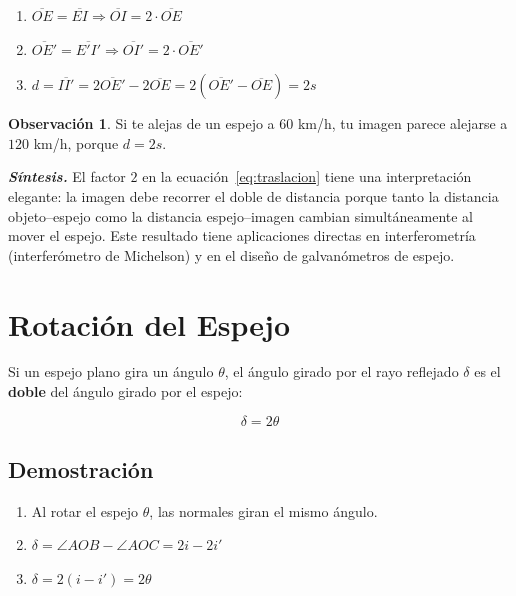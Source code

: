 \documentclass[12pt, a4paper]{article}
\theoremstyle{definition}
\newtheorem{observacion}{Observación}[section]
\begin{document}
\begin{enumerate}
  \item \(\overline{OE} = \overline{EI} \Rightarrow \overline{OI} = 2 \cdot \overline{OE}\)
  \item \(\overline{OE'} = \overline{E'I'} \Rightarrow \overline{OI'} = 2 \cdot \overline{OE'}\)
  \item \(d = \overline{II'} = 2\overline{OE'} - 2\overline{OE} = 2(\overline{OE'} - \overline{OE}) = 2s\)
\end{enumerate}

\begin{observacion}
Si te alejas de un espejo a \(60\) km/h, tu imagen parece alejarse a \(120\) km/h, porque \(d = 2s\).
\end{observacion}

\textit{\textbf{Síntesis.}} El factor \(2\) en la ecuación~\eqref{eq:traslacion} tiene una interpretación elegante: la imagen debe recorrer el doble de distancia porque tanto la distancia objeto–espejo como la distancia espejo–imagen cambian simultáneamente al mover el espejo. Este resultado tiene aplicaciones directas en interferometría (interferómetro de Michelson) y en el diseño de galvanómetros de espejo.

\section{Rotación del Espejo}

Si un espejo plano gira un ángulo \(\theta\), el ángulo girado por el rayo reflejado \(\delta\) es el \textbf{doble} del ángulo girado por el espejo:

\begin{equation}
  \delta = 2\theta
  \label{eq:rotacion}
\end{equation}

\subsection{Demostración}

\begin{enumerate}
  \item Al rotar el espejo \(\theta\), las normales giran el mismo ángulo.
  \item \(\delta = \angle AOB - \angle AOC = 2i - 2i'\)
  \item \(\delta = 2(i - i') = 2\theta\)
\end{enumerate}
\end{document}
